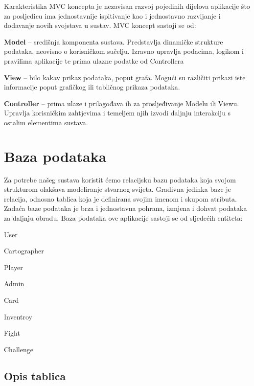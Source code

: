         Karakteristika MVC koncepta je nezavisan razvoj pojedinih dijelova aplikacije što za posljedicu ima jednostavnije ispitivanje kao i jednostavno razvijanje i dodavanje novih svojstava u sustav.
        MVC koncept sastoji se od:
        \begin{packed_item}
            \item \textbf{Model} – središnja komponenta sustava. Predstavlja dinamičke strukture podataka, neovisno o korisničkom sučelju. Izravno upravlja podacima, logikom i pravilima aplikacije te prima ulazne podatke od Controllera
            \item \textbf{View} – bilo kakav prikaz podataka, poput grafa. Mogući su različiti prikazi iste informacije poput grafičkog ili tabličnog prikaza podataka.
            \item \textbf{Controller} – prima ulaze i prilagođava ih za prosljeđivanje Modelu ili Viewu. Upravlja korisničkim zahtjevima i temeljem njih izvodi daljnju interakciju s ostalim elementima sustava.
        \end{packed_item}

				
		\section{Baza podataka}
			
			Za potrebe našeg sustava koristit ćemo relacijsku bazu podataka koja svojom strukturom olakšava modeliranje stvarnog svijeta. Gradivna jedinka baze je relacija, odnosno tablica koja je definirana svojim imenom i skupom atributa. Zadaća baze podataka je brza i jednostavna pohrana, izmjena i dohvat podataka za daljnju obradu. Baza podataka ove aplikacije sastoji se od sljedećih entiteta:
			\begin{packed_item}
			    \item User
                \item Cartographer
                \item Player
                \item Admin
                \item Card
                \item Inventroy
                \item Fight
                \item Challenge
			\end{packed_item}


		
			\subsection{Opis tablica}
			

